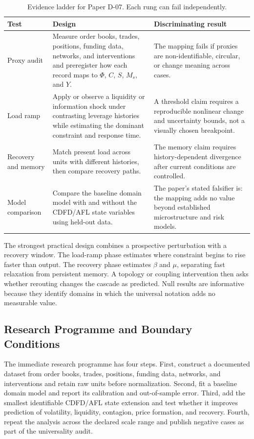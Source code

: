 \documentclass[11pt]{article}
\begin{document}
\begin{table}[htbp]
\centering
\small
\caption{Evidence ladder for Paper D-07. Each rung can fail independently.}
\begin{tabularx}{\textwidth}{|p{}|X|X|}
\hline
\textbf{Test} & \textbf{Design} & \textbf{Discriminating result} \\
\hline
Proxy audit & Measure order books, trades, positions, funding data, networks, and interventions and preregister how each record maps to $\Phi$, $C$, $S$, $M_s$, and $Y$. & The mapping fails if proxies are non-identifiable, circular, or change meaning across cases. \\
\hline
Load ramp & Apply or observe a liquidity or information shock under contrasting leverage histories while estimating the dominant constraint and response time. & A threshold claim requires a reproducible nonlinear change and uncertainty bounds, not a visually chosen breakpoint. \\
\hline
Recovery and memory & Match present load across units with different histories, then compare recovery paths. & The memory claim requires history-dependent divergence after current conditions are controlled. \\
\hline
Model comparison & Compare the baseline domain model with and without the CDFD/AFL state variables using held-out data. & The paper's stated falsifier is: the mapping adds no value beyond established microstructure and risk models. \\
\hline
\end{tabularx}
\end{table}

The strongest practical design combines a prospective perturbation with a
recovery window. The load-ramp phase estimates where constraint begins to rise
faster than output. The recovery phase estimates $\beta$ and $\mu$, separating
fast relaxation from persistent memory. A topology or coupling intervention
then asks whether rerouting changes the cascade as predicted. Null results are
informative because they identify domains in which the universal notation adds
no measurable value.

\subsection{Research Programme and Boundary Conditions}

The immediate research programme has four steps. First, construct a documented
dataset from order books, trades, positions, funding data, networks, and interventions and retain raw units before normalization.
Second, fit a baseline domain model and report its calibration and out-of-sample
error. Third, add the smallest identifiable CDFD/AFL state extension and test
whether it improves prediction of volatility, liquidity, contagion, price formation, and recovery. Fourth, repeat the
analysis across the declared scale range and publish negative cases as part of
the universality audit.
\end{document}
